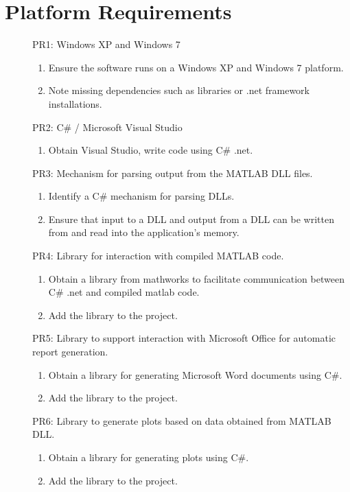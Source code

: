 \documentclass[pdftex,10pt,a4paper]{article}
\begin{document}
\section*{Platform Requirements}
\begin{description}
\item[] PR1: Windows XP and Windows 7
\begin{enumerate}
\item Ensure the software runs on a Windows XP and Windows 7 platform.
\item Note missing dependencies such as libraries or .net framework installations.
\end{enumerate}
\item[] PR2: C\# / Microsoft Visual Studio
\begin{enumerate}
\item Obtain Visual Studio, write code using C\# .net.
\end{enumerate}
\item[] PR3: Mechanism for parsing output from the MATLAB DLL files.
\begin{enumerate}
\item Identify a C\# mechanism for parsing DLLs.
\item Ensure that input to a DLL and output from a DLL can be written from and read into the application’s memory.
\end{enumerate}
\item[] PR4: Library for interaction with compiled MATLAB code.
\begin{enumerate}
\item Obtain a library from mathworks to facilitate communication between C\# .net and compiled matlab code.
\item Add the library to the project.
\end{enumerate}
\item[] PR5: Library to support interaction with Microsoft Office for automatic report generation.
\begin{enumerate}
\item Obtain a library for generating Microsoft Word documents using C\#.
\item Add the library to the project.
\end{enumerate}
\item[] PR6: Library to generate plots based on data obtained from MATLAB DLL.
\begin{enumerate}
\item Obtain a library for generating plots using C\#.
\item Add the library to the project.
\end{enumerate}
\end{description}
\end{document}
